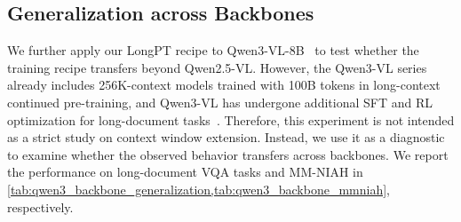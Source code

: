 {{{{\begin{table}[H]
 \centering
 \caption{Long-document VQA transfer across backbone models. We apply LongPT variants to Qwen3-VL-8B and report results on LongDocURL and SlideVQA. Since Qwen3-VL is already a 256K-context model trained with large-scale long-context pre-training, SFT, and RL, we focus on these two held-out document benchmarks.}
 \label{tab:qwen3_backbone_generalization}
 \setlength{\tabcolsep}{4pt}
\end{table}

\subsection{Generalization across Backbones}
\label{app:complementary_experiment_results:backbone}

We further apply our LongPT recipe to Qwen3-VL-8B~\citep{bai2025qwen3} to test whether the training recipe transfers beyond Qwen2.5-VL.
However, the Qwen3-VL series already includes 256K-context models trained with 100B tokens in long-context continued pre-training, and Qwen3-VL has undergone additional SFT and RL optimization for long-document tasks~\citep{bai2025qwen3}.
Therefore, this experiment is not intended as a strict study on context window extension.
Instead, we use it as a diagnostic to examine whether the observed behavior transfers across backbones.
We report the performance on long-document VQA tasks and MM-NIAH in \cref{tab:qwen3_backbone_generalization,tab:qwen3_backbone_mmniah}, respectively.

}}}}
